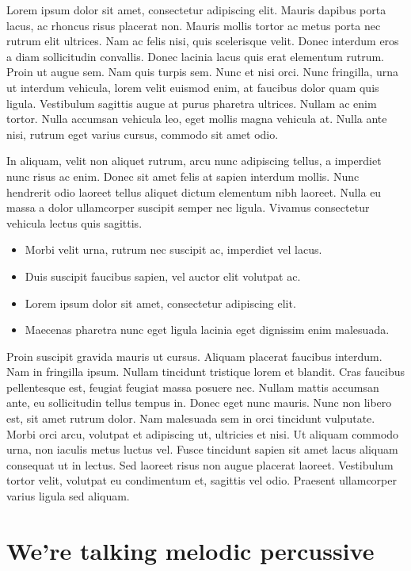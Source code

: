 \documentclass[11pt,oneside,openany]{book}
\begin{document}
Lorem ipsum dolor sit amet, consectetur adipiscing elit. Mauris dapibus porta lacus, ac rhoncus risus placerat non. Mauris mollis tortor ac metus porta nec rutrum elit ultrices. Nam ac felis nisi, quis scelerisque velit. Donec interdum eros a diam sollicitudin convallis. Donec lacinia lacus quis erat elementum rutrum. Proin ut augue sem. Nam quis turpis sem. Nunc et nisi orci. Nunc fringilla, urna ut interdum vehicula, lorem velit euismod enim, at faucibus dolor quam quis ligula. Vestibulum sagittis augue at purus pharetra ultrices. Nullam ac enim tortor. Nulla accumsan vehicula leo, eget mollis magna vehicula at. Nulla ante nisi, rutrum eget varius cursus, commodo sit amet odio.

In aliquam, velit non aliquet rutrum, arcu nunc adipiscing tellus, a imperdiet nunc risus ac enim. Donec sit amet felis at sapien interdum mollis. Nunc hendrerit odio laoreet tellus aliquet dictum elementum nibh laoreet. Nulla eu massa a dolor ullamcorper suscipit semper nec ligula. Vivamus consectetur vehicula lectus quis sagittis.

\begin{itemize}
\item Morbi velit urna, rutrum nec suscipit ac, imperdiet vel lacus.
\item Duis suscipit faucibus sapien, vel auctor elit volutpat ac.
\item Lorem ipsum dolor sit amet, consectetur adipiscing elit.
\item Maecenas pharetra nunc eget ligula lacinia eget dignissim enim malesuada.
\end{itemize}

Proin suscipit gravida mauris ut cursus. Aliquam placerat faucibus interdum. Nam in fringilla ipsum. Nullam tincidunt tristique lorem et blandit. Cras faucibus pellentesque est, feugiat feugiat massa posuere nec. Nullam mattis accumsan ante, eu sollicitudin tellus tempus in. Donec eget nunc mauris. Nunc non libero est, sit amet rutrum dolor. Nam malesuada sem in orci tincidunt vulputate. Morbi orci arcu, volutpat et adipiscing ut, ultricies et nisi. Ut aliquam commodo urna, non iaculis metus luctus vel. Fusce tincidunt sapien sit amet lacus aliquam consequat ut in lectus. Sed laoreet risus non augue placerat laoreet. Vestibulum tortor velit, volutpat eu condimentum et, sagittis vel odio. Praesent ullamcorper varius ligula sed aliquam.

\chapter{We're talking melodic percussive}\hypertarget{were-talking-melodic-percussive}{}\label{were-talking-melodic-percussive}
\end{document}
